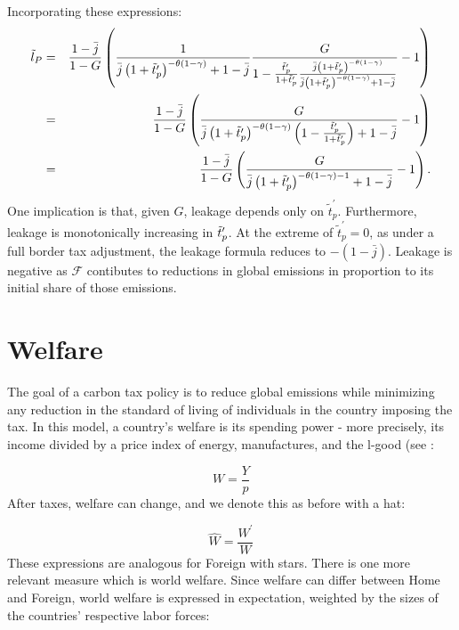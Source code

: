 \documentclass[notitlepage,12pt]{article}
\begin{document}
Incorporating these expressions:%
\begin{eqnarray*}
\tilde{l}_{P} &=&\frac{1-\bar{j}}{1-G}\left( \frac{1}{\bar{j}\left( 1+\tilde{%
t}_{p}^{\prime }\right) ^{-\theta \left( 1-\gamma \right) }+1-\bar{j}}\frac{G%
}{1-\frac{\tilde{t}_{p}^{\prime }}{1+\tilde{t}_{p}^{\prime }}\frac{\bar{j}%
\left( 1+\tilde{t}_{p}^{\prime }\right) ^{-\theta \left( 1-\gamma \right) }}{%
\bar{j}\left( 1+\tilde{t}_{p}^{\prime }\right) ^{-\theta \left( 1-\gamma
\right) }+1-\bar{j}}}-1\right)  \\
&=&\frac{1-\bar{j}}{1-G}\left( \frac{G}{\bar{j}\left( 1+\tilde{t}%
_{p}^{\prime }\right) ^{-\theta \left( 1-\gamma \right) }\left( 1-\frac{%
\tilde{t}_{p}^{\prime }}{1+\tilde{t}_{p}^{\prime }}\right) +1-\bar{j}}%
-1\right)  \\
&=&\frac{1-\bar{j}}{1-G}\left( \frac{G}{\bar{j}\left( 1+\tilde{t}%
_{p}^{\prime }\right) ^{-\theta \left( 1-\gamma \right) -1}+1-\bar{j}}%
-1\right) .
\end{eqnarray*}%
One implication is that, given $G$, leakage depends only on $\tilde{t}%
_{p}^{\prime }$. Furthermore, leakage is monotonically increasing in $\tilde{%
t}_{p}^{\prime }$. At the extreme of $\tilde{t}_{p}^{\prime }=0$, as under a
full border tax adjustment, the leakage formula reduces to $-\left( 1-\bar{j}%
\right) $. Leakage is negative as $\mathcal{F}$ contibutes to reductions in
global emissions in proportion to its initial share of those emissions.

\section{Welfare}

The goal of a carbon tax policy is to reduce global emissions while
minimizing any reduction in the standard of living of individuals in the
country imposing the tax. In this model, a country's welfare is its spending
power - more precisely, its income divided by a price index of energy,
manufactures, and the l-good (see :

\begin{equation*}
W = \frac{Y}{p}
\end{equation*}
After taxes, welfare can change, and we denote this as before with a hat:

\begin{equation*}
\hat{W} = \frac{W^\prime}{W}
\end{equation*}
These expressions are analogous for Foreign with stars. There is one more
relevant measure which is world welfare. Since welfare can differ between
Home and Foreign, world welfare is expressed in expectation, weighted by the
sizes of the countries' respective labor forces:
\end{document}
